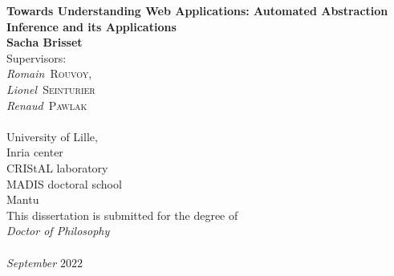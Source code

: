 \begin{titlepage}
\begin{center}

{\LARGE {\bf 
Towards Understanding Web Applications: Automated Abstraction Inference and its Applications
}}
\\[2cm]
{\large{ \bf {Sacha Brisset}}}
\\[1cm]

Supervisors: \\[0.35cm]
\emph{Romain}~\textsc{Rouvoy}, \\
\emph{Lionel}~\textsc{Seinturier}\\
\emph{Renaud}~\textsc{Pawlak} \\
\\[2cm]
{\large University of Lille, \\
Inria center \\
CRIStAL laboratory \\
MADIS doctoral school \\
Mantu
}
\\[1cm]
This dissertation is submitted for the degree of \\ \textit{Doctor of Philosophy}
\\[2cm]
\\[2cm]

\textit{September $2022$}

\end{center}
\end{titlepage}

